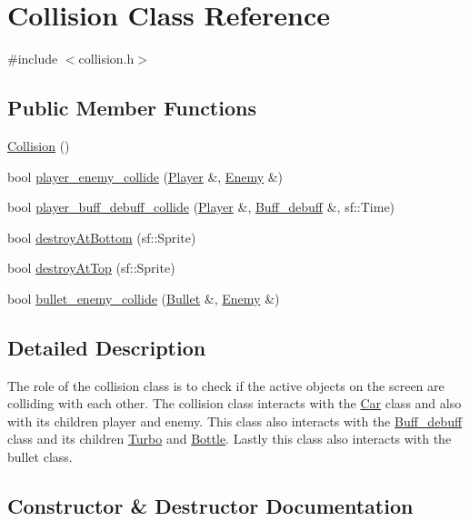 \hypertarget{classCollision}{}\section{Collision Class Reference}
\label{classCollision}


{\ttfamily \#include $<$collision.\+h$>$}

\subsection*{Public Member Functions}
\begin{DoxyCompactItemize}
\item 
\hyperlink{classCollision_aea8004fbf48b79b5db7b784688b23788}{Collision} ()
\item 
bool \hyperlink{classCollision_a850f6ea5287cf6b2dd6765f5f9684cd5}{player\+\_\+enemy\+\_\+collide} (\hyperlink{classPlayer}{Player} \&, \hyperlink{classEnemy}{Enemy} \&)
\item 
bool \hyperlink{classCollision_ace87dc1e8d64435fda445f324b41fd58}{player\+\_\+buff\+\_\+debuff\+\_\+collide} (\hyperlink{classPlayer}{Player} \&, \hyperlink{classBuff__debuff}{Buff\+\_\+debuff} \&, sf\+::\+Time)
\item 
bool \hyperlink{classCollision_a3dcc2e9cfec6cc09445681a14fd3bfe4}{destroy\+At\+Bottom} (sf\+::\+Sprite)
\item 
bool \hyperlink{classCollision_a0a0e86390b15d8d745de4cf3707ced9d}{destroy\+At\+Top} (sf\+::\+Sprite)
\item 
bool \hyperlink{classCollision_a213b32a24bb00368732cd7170049c65e}{bullet\+\_\+enemy\+\_\+collide} (\hyperlink{classBullet}{Bullet} \&, \hyperlink{classEnemy}{Enemy} \&)
\end{DoxyCompactItemize}


\subsection{Detailed Description}
The role of the collision class is to check if the active objects on the screen are colliding with each other. The collision class interacts with the \hyperlink{classCar}{Car} class and also with its children player and enemy. This class also interacts with the \hyperlink{classBuff__debuff}{Buff\+\_\+debuff} class and it\textquotesingle{}s children \hyperlink{classTurbo}{Turbo} and \hyperlink{classBottle}{Bottle}. Lastly this class also interacts with the bullet class. 

\subsection{Constructor \& Destructor Documentation}
\mbox{\label{classCollision_aea8004fbf48b79b5db7b784688b23788}} 
